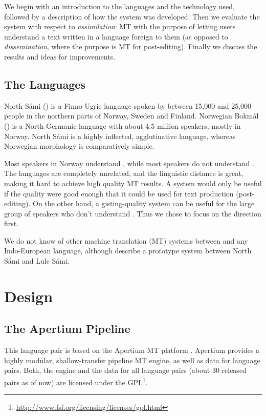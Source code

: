 We begin with an introduction to the languages and the technology
used, followed by a description of how the system was developed. Then
we evaluate the system with respect to \textit{assimilation}: MT with
the purpose of letting users understand a text written in a language
foreign to them (as opposed to \textit{dissemination}, where the
purpose is MT for post-editing). Finally we discuss the results and
ideas for improvements.

\subsection{The Languages}
North S\'{a}mi (\sme{}) is a Finno-Ugric language spoken by between 
15,000 and 25,000 people in the northern parts of Norway, Sweden and
Finland. Norwegian Bokm{\aa}l (\nob{}) is a North Germanic language
with about 4.5 million speakers, mostly in Norway. North S\'{a}mi %
is a highly inflected, agglutinative language, whereas Norwegian
morphology is comparatively simple.

Most \sme{} speakers in Norway understand \nob{}, while most \nob{}
speakers do not understand \sme{}. The languages are completely
unrelated, and the linguistic distance is great, making it hard to
achieve high quality MT results. A \nobsme{} system would only be useful if the
quality were good enough that it could be used for text production
(post-editing). On the other hand, a \smenob{} gisting-quality system
can be useful for the large group of \nob{} speakers who don't
understand \sme{}. Thus we chose to focus on the \smenob{} direction
first.

We do not know of other machine translation (MT) systems between \sme{}
and any Indo-European language, although \citet{tyers2009dpm} describe %
a prototype system between North S\'{a}mi and Lule S\'{a}mi.



\section{Design}
 \label{sec:design}

\subsection{The Apertium Pipeline}
This language pair is based on the Apertium MT
platform \citep{forcada2011afp,zubizarreta2009amt}. Apertium provides a
highly modular, shallow-transfer pipeline MT engine, as well as data
for language pairs. Both, the engine and the data for all language
pairs (about 30 released pairs as of now) are licensed under the
GPL\footnote{\href{http://www.fsf.org/licensing/licenses/gpl.html}{http://www.fsf.org/licensing/licenses/gpl.html}}.

